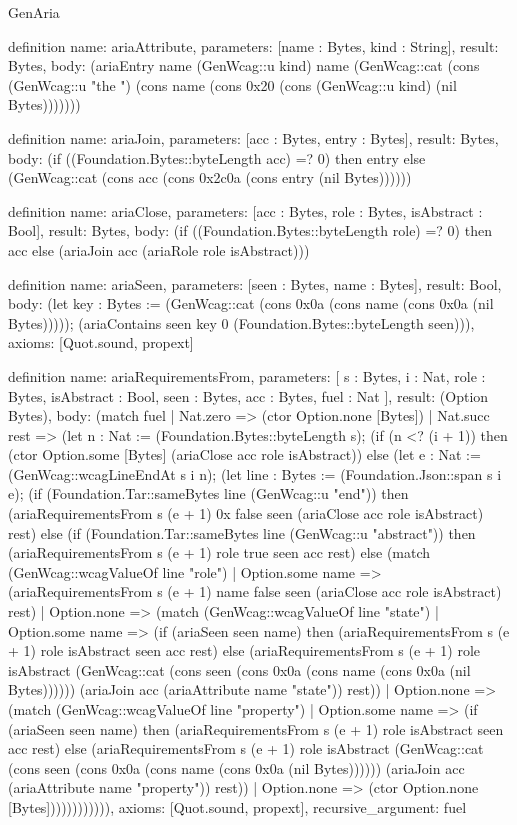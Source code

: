 \begin{lexlean}{GenAria}
\begin{semanticmodule}
definition{
  name: ariaAttribute,
  parameters: [name : Bytes, kind : String],
  result: Bytes,
  body: (ariaEntry name (GenWcag::u kind) name (GenWcag::cat (cons (GenWcag::u "the ") (cons name (cons 0x20 (cons (GenWcag::u kind) (nil Bytes)))))))
}

definition{
  name: ariaJoin,
  parameters: [acc : Bytes, entry : Bytes],
  result: Bytes,
  body: (if ((Foundation.Bytes::byteLength acc) =? 0) then entry else (GenWcag::cat (cons acc (cons 0x2c0a (cons entry (nil Bytes))))))
}

definition{
  name: ariaClose,
  parameters: [acc : Bytes, role : Bytes, isAbstract : Bool],
  result: Bytes,
  body: (if ((Foundation.Bytes::byteLength role) =? 0) then acc else (ariaJoin acc (ariaRole role isAbstract)))
}

definition{
  name: ariaSeen,
  parameters: [seen : Bytes, name : Bytes],
  result: Bool,
  body: (let key : Bytes := (GenWcag::cat (cons 0x0a (cons name (cons 0x0a (nil Bytes))))); (ariaContains seen key 0 (Foundation.Bytes::byteLength seen))),
  axioms: [Quot.sound, propext]
}

definition{
  name: ariaRequirementsFrom,
  parameters: [
    s : Bytes,
    i : Nat,
    role : Bytes,
    isAbstract : Bool,
    seen : Bytes,
    acc : Bytes,
    fuel : Nat
  ],
  result: (Option Bytes),
  body: (match fuel
    | Nat.zero => (ctor Option.none [Bytes])
    | Nat.succ rest => (let n : Nat := (Foundation.Bytes::byteLength s); (if (n <? (i + 1)) then (ctor Option.some [Bytes] (ariaClose acc role isAbstract)) else (let e : Nat := (GenWcag::wcagLineEndAt s i n); (let line : Bytes := (Foundation.Json::span s i e); (if (Foundation.Tar::sameBytes line (GenWcag::u "end")) then (ariaRequirementsFrom s (e + 1) 0x false seen (ariaClose acc role isAbstract) rest) else (if (Foundation.Tar::sameBytes line (GenWcag::u "abstract")) then (ariaRequirementsFrom s (e + 1) role true seen acc rest) else (match (GenWcag::wcagValueOf line "role")
      | Option.some name => (ariaRequirementsFrom s (e + 1) name false seen (ariaClose acc role isAbstract) rest)
      | Option.none => (match (GenWcag::wcagValueOf line "state")
        | Option.some name => (if (ariaSeen seen name) then (ariaRequirementsFrom s (e + 1) role isAbstract seen acc rest) else (ariaRequirementsFrom s (e + 1) role isAbstract (GenWcag::cat (cons seen (cons 0x0a (cons name (cons 0x0a (nil Bytes)))))) (ariaJoin acc (ariaAttribute name "state")) rest))
        | Option.none => (match (GenWcag::wcagValueOf line "property")
          | Option.some name => (if (ariaSeen seen name) then (ariaRequirementsFrom s (e + 1) role isAbstract seen acc rest) else (ariaRequirementsFrom s (e + 1) role isAbstract (GenWcag::cat (cons seen (cons 0x0a (cons name (cons 0x0a (nil Bytes)))))) (ariaJoin acc (ariaAttribute name "property")) rest))
          | Option.none => (ctor Option.none [Bytes]))))))))))),
  axioms: [Quot.sound, propext],
  recursive_argument: fuel
}


\end{semanticmodule}
\end{lexlean}

